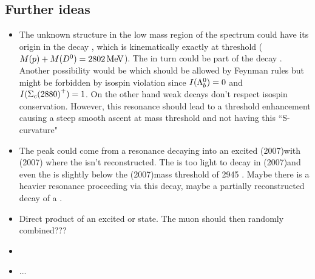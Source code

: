 \subsection{Further ideas}
\begin{itemize}
    \item The unknown structure in the low mass region of the \Dz\proton spectrum could have its origin in the decay , which is kinematically exactly at threshold ($M({p})+M({{D}^0})=2802\mathrm{\,Me\kern -0.1em V}$).  
          The  in turn could be part of the decay . 
          Another possibility would be  which should be allowed by Feynman rules but might be forbidden by isospin violation since $I({{\Lambda}^0_{b}}) = 0$ and $I(\Sigma_{c}{(2880)}^{+}) = 1$. 
          On the other hand weak decays don't respect isospin conservation.
          However, this resonance should lead to a threshold enhancement causing a steep smooth ascent at mass threshold and not having this ``S-curvature"
    \item The peak could come from a resonance decaying into an excited \Dstar(2007)\proton with \Dstar(2007) \to \Dz\pion where the \pion isn't reconstructed.
          The \LcResI is too light to decay in \Dstar(2007)\proton and even the \LcResII is slightly below the \Dstar(2007)\proton mass threshold of 2945 \mev. 
          Maybe there is a heavier resonance proceeding via this decay, maybe a partially reconstructed decay of a \Sigmacp.
    \item Direct product of an excited \Lc or \Sigmacp state. The muon should then randomly combined???
    \item 
    \item ...
\end{itemize}


